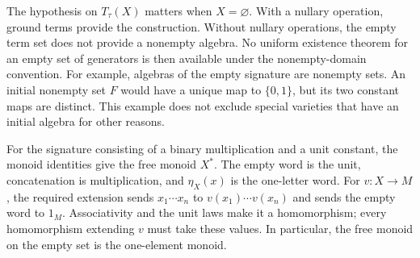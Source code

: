 The hypothesis on \(T_\tau(X)\) matters when \(X=\varnothing\).
With a nullary operation, ground terms provide the construction.
Without nullary operations, the empty term set does not provide a
nonempty algebra. No uniform existence theorem for an empty set of
generators is then available under the nonempty-domain convention.
For example, algebras of the empty signature are nonempty sets.
An initial nonempty set \(F\) would have a unique map to \(\{0,1\}\),
but its two constant maps are distinct.
This example does not exclude special varieties that have an initial
algebra for other reasons.

For the signature consisting of a binary multiplication and a unit
constant, the monoid identities give the free monoid \(X^*\).
The empty word is the unit, concatenation is multiplication, and
\(\eta_X(x)\) is the one-letter word.
For \(v:X\to M\), the required extension sends
\(x_1\cdots x_n\) to \(v(x_1)\cdots v(x_n)\) and sends the empty
word to \(1_M\).
Associativity and the unit laws make it a homomorphism; every
homomorphism extending \(v\) must take these values.
In particular, the free monoid on the empty set is the one-element
monoid.
